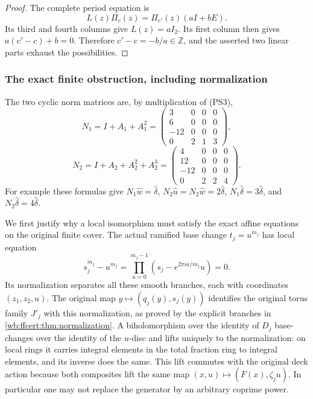 \begin{proof}
The complete period equation is
\[
                   L(z)\Pi_c(z)=\Pi_{c'}(z)(aI+bE).
 \tag{PS8}\label{wb:pshift:eq:period-morphism}
\]
Its third and fourth columns give $L(z)=aI_2$. Its first column
then gives $a(c'-c)+b=0$. Therefore $c'-c=-b/a\in\mathbb Z$,
and the asserted two linear parts exhaust the possibilities.
\end{proof}

\subsubsection{The exact finite obstruction, including normalization}

The two cyclic norm matrices are, by multiplication of (PS3),
\[
 N_1=I+A_1+A_1^2=
 \begin{pmatrix}3&0&0&0\\6&0&0&0\\-12&0&0&0\\0&2&1&3\end{pmatrix},
\]
\[
 N_2=I+A_2+A_2^2+A_2^3=
 \begin{pmatrix}4&0&0&0\\12&0&0&0\\-12&0&0&0\\0&2&2&4\end{pmatrix}.
 \tag{PS9}\label{wb:pshift:eq:norms}
\]
For example these formulas give
$N_1\widehat w=\widehat\delta$,
$N_2\widehat u=N_2\widehat w=2\widehat\delta$,
$N_1\widehat\delta=3\widehat\delta$, and
$N_2\widehat\delta=4\widehat\delta$.

We first justify why a local isomorphism must satisfy the exact affine
equations on the original finite cover. The actual ramified base change
$t_j=u^{m_j}$ has local equation
\[
 s_j^{m_j}-u^{m_j}
   =\prod_{a=0}^{m_j-1}(s_j-e^{2\pi ia/m_j}u)=0.
\]
Its normalization separates all these smooth branches, each with
coordinates $(z_1,z_2,u)$. The original map
$y\mapsto(q_j(y),s_j(y))$ identifies the original torus family $J'_j$
with this normalization, as proved by the explicit branches in
\cref{wb:ffcert:thm:normalization}. A biholomorphism over the identity of
$D_j$ base-changes over the identity of the $u$-disc and lifts uniquely
to the normalization: on local rings it carries integral elements in
the total fraction ring to integral elements, and its inverse does
the same. This lift commutes with the original deck action because
both composites lift the same map $(x,u)\mapsto(F(x),\zeta_j u)$.
In particular one may not replace the generator by an arbitrary
coprime power.

